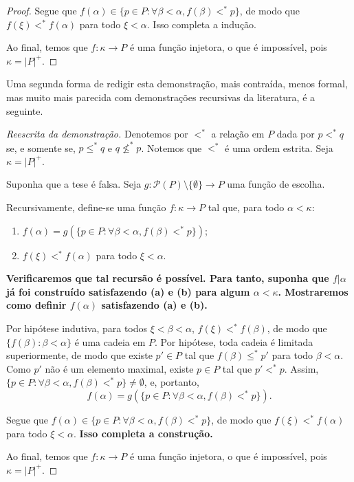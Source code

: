 \begin{proof}
    Segue que $f(\alpha)\in \{p\in P: \forall \beta<\alpha, f(\beta)<^* p\}$, de modo que $f(\xi)<^* f(\alpha)$ para todo $\xi<\alpha$.
    Isso completa a indução.

    Ao final, temos que $f:\kappa\to P$ é uma função injetora, o que é impossível, pois $\kappa=|P|^+$.
\end{proof}

Uma segunda forma de redigir esta demonstração, mais contraída, menos formal, mas muito mais parecida com demonstrações recursivas da literatura, é a seguinte.

\begin{proof}[Reescrita da demonstração]
    Denotemos por $<^*$ a relação em $P$ dada por $p<^* q$ se, e somente se, $p\leq^* q$ e $q\not\leq^* p$.
    Notemos que $<^*$ é uma ordem estrita.
    Seja $\kappa=|P|^+$.

    Suponha que a tese é falsa.
    Seja $g:\mathcal P(P)\setminus\{\emptyset\}\to P$ uma função de escolha.
    
    Recursivamente, define-se uma função $f: \kappa\to P$ tal que, para todo $\alpha<\kappa$:
    \begin{enumerate}[label=(\alph*)]
        \item $f(\alpha)=g(\{p\in P: \forall \beta<\alpha, f(\beta)<^* p\})$;
        \item $f(\xi)<^* f(\alpha)$ para todo $\xi<\alpha$.
    \end{enumerate}

    \textbf{Verificaremos que tal recursão é possível.
    Para tanto, suponha que $f|\alpha$ já foi construído satisfazendo (a) e (b) para algum $\alpha<\kappa$.
    Mostraremos como definir $f(\alpha)$ satisfazendo (a) e (b).}

    Por hipótese indutiva, para todos $\xi<\beta<\alpha$, $f(\xi)<^* f(\beta)$, de modo que $\{f(\beta): \beta<\alpha\}$ é uma cadeia em $P$.
    Por hipótese, toda cadeia é limitada superiormente, de modo que existe $p'\in P$ tal que $f(\beta)\leq^* p'$ para todo $\beta<\alpha$.
    Como $p'$ não é um elemento maximal, existe $p\in P$ tal que $p'<^* p$.
    Assim, $\{p\in P: \forall \beta<\alpha, f(\beta)<^* p\}\neq \emptyset$, e, portanto,
    \[
        f(\alpha)=g(\{p\in P: \forall \beta<\alpha, f(\beta)<^* p\}).
    \]

    Segue que $f(\alpha)\in \{p\in P: \forall \beta<\alpha, f(\beta)<^* p\}$, de modo que $f(\xi)<^* f(\alpha)$ para todo $\xi<\alpha$.
    \textbf{Isso completa a construção.}

    Ao final, temos que $f:\kappa\to P$ é uma função injetora, o que é impossível, pois $\kappa=|P|^+$.
\end{proof}

